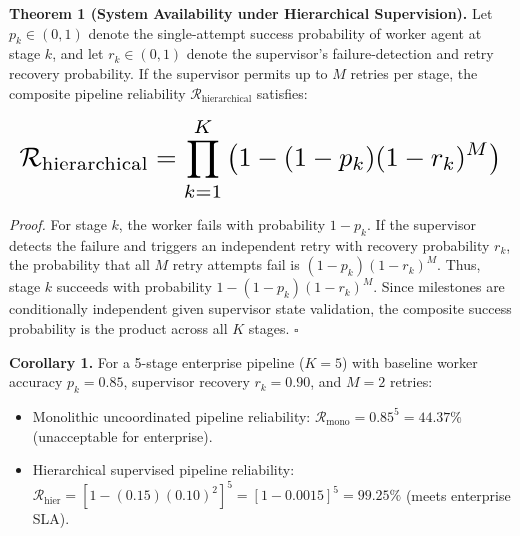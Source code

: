 \documentclass[10pt,journal,compsoc,twocolumn]{IEEEtran}
\begin{document}
\textbf{Theorem 1 (System Availability under Hierarchical Supervision).} Let $p_k \in (0, 1)$ denote the single-attempt success probability of worker agent at stage $k$, and let $r_k \in (0, 1)$ denote the supervisor's failure-detection and retry recovery probability. If the supervisor permits up to $M$ retries per stage, the composite pipeline reliability $\mathcal{R}_{\text{hierarchical}}$ satisfies:


























\begin{equation}
\resizebox{\columnwidth}{!}{$\displaystyle
\begin{aligned}
\mathcal{R}_{\text{hierarchical}} = \prod_{k=1}^K \left( 1 - (1 - p_k)(1 - r_k)^M \right)
\end{aligned}
$}
\end{equation}


























\textit{Proof.} For stage $k$, the worker fails with probability $1 - p_k$. If the supervisor detects the failure and triggers an independent retry with recovery probability $r_k$, the probability that all $M$ retry attempts fail is $(1 - p_k)(1 - r_k)^M$. Thus, stage $k$ succeeds with probability $1 - (1 - p_k)(1 - r_k)^M$. Since milestones are conditionally independent given supervisor state validation, the composite success probability is the product across all $K$ stages. $\square$

\textbf{Corollary 1.} For a 5-stage enterprise pipeline ($K = 5$) with baseline worker accuracy $p_k = 0.85$, supervisor recovery $r_k = 0.90$, and $M = 2$ retries:
\begin{itemize}
  \item Monolithic uncoordinated pipeline reliability: $\mathcal{R}_{\text{mono}} = 0.85^5 = 44.37\%$ (unacceptable for enterprise).
  \item Hierarchical supervised pipeline reliability: $\mathcal{R}_{\text{hier}} = [1 - (0.15)(0.10)^2]^5 = [1 - 0.0015]^5 = 99.25\%$ (meets enterprise SLA).
\end{itemize}
\end{document}
